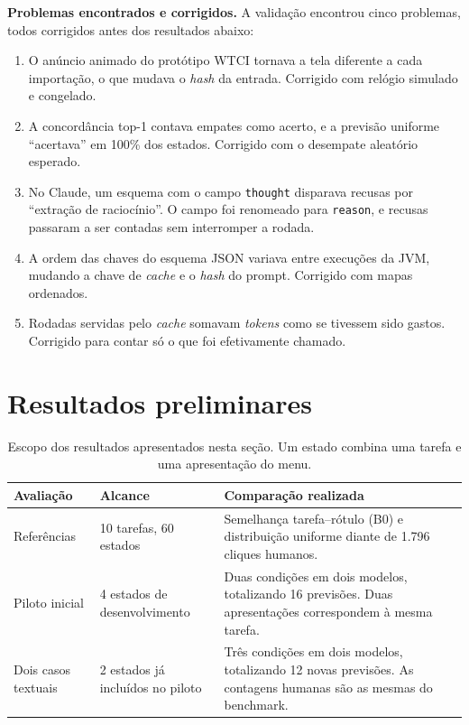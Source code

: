 \documentclass[12pt]{article}
\newcommand{\code}[1]{\texttt{#1}}
\begin{document}
\textbf{Problemas encontrados e corrigidos.} A validação encontrou cinco problemas, todos corrigidos antes dos resultados abaixo:
\begin{enumerate}[leftmargin=*,itemsep=0pt]
\item O anúncio animado do protótipo WTCI tornava a tela diferente a cada importação, o que mudava o \textit{hash} da entrada. Corrigido com relógio simulado e congelado.
\item A concordância top-1 contava empates como acerto, e a previsão uniforme ``acertava'' em 100\% dos estados. Corrigido com o desempate aleatório esperado.
\item No Claude, um esquema com o campo \code{thought} disparava recusas por ``extração de raciocínio''. O campo foi renomeado para \code{reason}, e recusas passaram a ser contadas sem interromper a rodada.
\item A ordem das chaves do esquema JSON variava entre execuções da JVM, mudando a chave de \textit{cache} e o \textit{hash} do prompt. Corrigido com mapas ordenados.
\item Rodadas servidas pelo \textit{cache} somavam \textit{tokens} como se tivessem sido gastos. Corrigido para contar só o que foi efetivamente chamado.
\end{enumerate}

\section{Resultados preliminares}
\label{sec:resultados}

\begin{table}[htbp]
\centering\small
\caption{Escopo dos resultados apresentados nesta seção. Um estado combina uma tarefa e uma apresentação do menu.}
\begin{tabularx}{\linewidth}{@{}p{3.3cm}p{3.3cm}Y@{}}\toprule
Avaliação & Alcance & Comparação realizada \\ \midrule
Referências & 10 tarefas, 60 estados & Semelhança tarefa--rótulo (B0) e distribuição uniforme diante de 1.796 cliques humanos. \\
Piloto inicial & 4 estados de desenvolvimento & Duas condições em dois modelos, totalizando 16 previsões. Duas apresentações correspondem à mesma tarefa. \\
Dois casos textuais & 2 estados já incluídos no piloto & Três condições em dois modelos, totalizando 12 novas previsões. As contagens humanas são as mesmas do benchmark. \\
\bottomrule\end{tabularx}\end{table}
\end{document}
